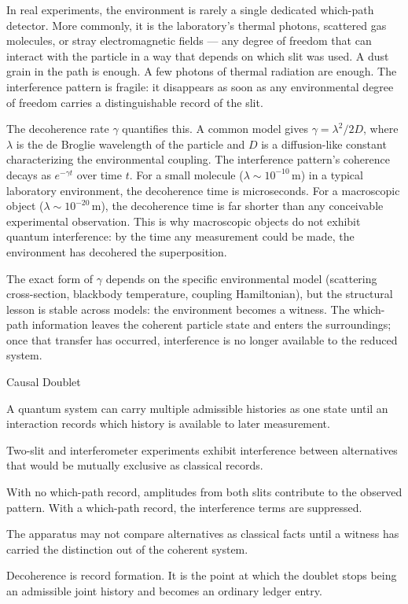 In real experiments, the environment is rarely a single dedicated
which-path detector. More commonly, it is the laboratory's thermal
photons, scattered gas molecules, or stray electromagnetic fields ---
any degree of freedom that can interact with the particle in a way
that depends on which slit was used. A dust grain in the path is enough.
A few photons of thermal radiation are enough. The interference
pattern is fragile: it disappears as soon as any environmental degree
of freedom carries a distinguishable record of the slit.

The decoherence rate $\gamma$ quantifies this. A common model gives
$\gamma = \lambda^2 / 2D$, where $\lambda$ is the de Broglie wavelength
of the particle and $D$ is a diffusion-like constant characterizing
the environmental coupling. The interference pattern's coherence
decays as $e^{-\gamma t}$ over time $t$. For a small molecule ($\lambda
\sim 10^{-10}\,\mathrm{m}$) in a typical laboratory environment, the
decoherence time is microseconds. For a macroscopic object ($\lambda
\sim 10^{-20}\,\mathrm{m}$), the decoherence time is far shorter than
any conceivable experimental observation. This is why macroscopic
objects do not exhibit quantum interference: by the time any
measurement could be made, the environment has decohered the
superposition.

The exact form of $\gamma$ depends on the specific environmental model
(scattering cross-section, blackbody temperature, coupling Hamiltonian),
but the structural lesson is stable across models: the environment
becomes a witness. The which-path information leaves the coherent
particle state and enters the surroundings; once that transfer has
occurred, interference is no longer available to the reduced system.

\begin{phenom}{Causal Doublet}
\label{ph:causal-doublet}

\PhStatement A quantum system can carry multiple admissible histories as one
state until an interaction records which history is available to later
measurement.

\PhOrigin Two-slit and interferometer experiments exhibit interference between
alternatives that would be mutually exclusive as classical records.

\PhObservation With no which-path record, amplitudes from both slits contribute
to the observed pattern. With a which-path record, the interference terms are
suppressed.

\PhConstraint The apparatus may not compare alternatives as classical facts
until a witness has carried the distinction out of the coherent system.

\PhConsequence Decoherence is record formation. It is the point at which the
doublet stops being an admissible joint history and becomes an ordinary
ledger entry.

\end{phenom}

